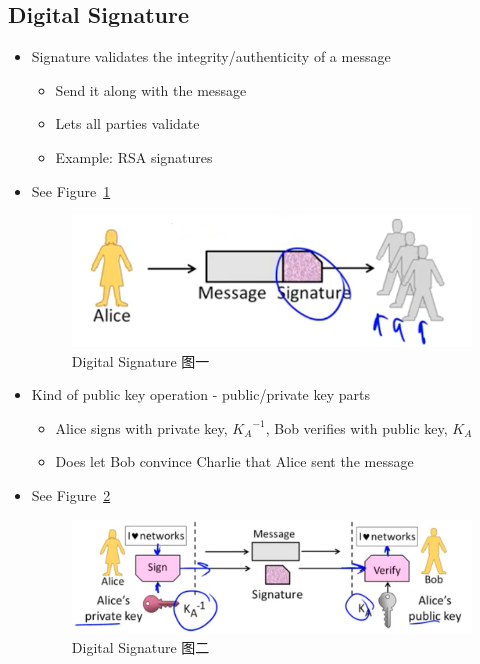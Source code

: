 \documentclass[12pt]{ctexart}   %
\begin{document}
	\subsection{Digital Signature}
	\begin{itemize}
		\item Signature validates the integrity/authenticity of a message
		\begin{itemize}
			\item Send it along with the message
			\item Lets all parties validate
			\item Example: RSA signatures
		\end{itemize}
		\item See Figure~\ref{fig:10-3-5}
		  
		\begin{figure}[h!] %
		\centering
		\includegraphics[scale=0.7]{images/10-3-5}
		\caption{Digital Signature 图一}
		\label{fig:10-3-5}
		\end{figure}

		\item Kind of public key operation -  public/private key parts
		\begin{itemize}
			\item Alice signs with private key, ${K_A}^{-1}$, Bob verifies with public key, $K_A$
			\item Does let Bob convince Charlie that Alice sent the message
		\end{itemize}
		\item See Figure~\ref{fig:10-3-6}
		  
		\begin{figure}[h!] %
		\centering
		\includegraphics[scale=0.7]{images/10-3-6}
		\caption{Digital Signature 图二}
		\label{fig:10-3-6}
		\end{figure}
	\end{itemize}
\end{document}
